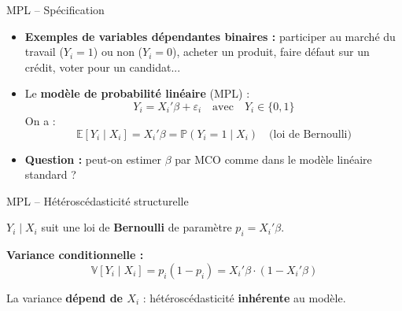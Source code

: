 \documentclass[11pt,aspectratio=169]{beamer}
\newcommand{\E}{\mathbb{E}}
\newcommand{\Var}{\mathbb{V}}
\newcommand{\Prob}{\mathbb{P}}
\begin{document}
\begin{frame}{MPL -- Spécification}

\begin{itemize}

\item \textbf{Exemples de variables dépendantes binaires :} participer au marché du travail ($Y_i = 1$) ou non ($Y_i = 0$), acheter un produit, faire défaut sur un crédit, voter pour un candidat...\newline

\item Le \textbf{modèle de probabilité linéaire} (MPL) :
  \[
  Y_i = X_i'\beta + \varepsilon_i \quad \text{avec} \quad Y_i \in \{0, 1\}
  \]
  On a :
  \[
  \E[Y_i \mid X_i] = X_i'\beta = \Prob(Y_i = 1 \mid X_i) \quad \text{(loi de Bernoulli)}
  \]\newline

\item \textbf{Question :} peut-on estimer $\beta$ par MCO comme dans le modèle linéaire standard ?

\end{itemize}

\end{frame}

\begin{frame}{MPL -- Hétéroscédasticité structurelle}

$Y_i \mid X_i$ suit une loi de \textbf{Bernoulli} de paramètre $p_i = X_i'\beta$.

\vspace{0.3cm}

\textbf{Variance conditionnelle :}
\[
\Var[Y_i \mid X_i] = p_i(1-p_i) = X_i'\beta \cdot (1 - X_i'\beta)
\]

\begin{center}
\end{center}

La variance \textbf{dépend de $X_i$} : hétéroscédasticité \textbf{inhérente} au modèle.

\end{frame}
\end{document}
